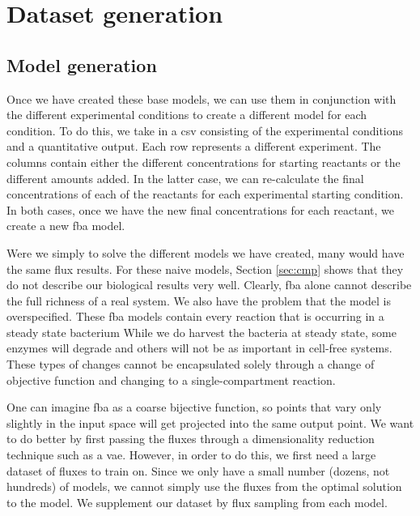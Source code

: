 
\section{Dataset generation}

\subsection{Model generation}
Once we have created these base models, we can use them in conjunction with the different experimental conditions to create a different model for each condition.
To do this, we take in a \gls{csv} consisting of the experimental conditions and a quantitative output.
Each row represents a different experiment.
The columns contain either the different concentrations for starting reactants or the different amounts added.
In the latter case, we can re-calculate the final concentrations of each of the reactants for each experimental starting condition.
In both cases, once we have the new final concentrations for each reactant, we create a new \gls{fba} model.

Were we simply to solve the different models we have created, many would have the same flux results.
For these naive models, Section \ref{sec:cmp} shows that they do not describe our biological results very well.
Clearly, \gls{fba} alone cannot describe the full richness of a real system.
We also have the problem that the model is overspecified.
These \gls{fba} models contain every reaction that is occurring in a steady state bacterium
While we do harvest the bacteria at steady state, some enzymes will degrade and others will not be as important in cell-free systems.
These types of changes cannot be encapsulated solely through a change of objective function and changing to a single-compartment reaction.

One can imagine \gls{fba} as a coarse bijective function, so points that vary only slightly in the input space will get projected into the same output point.
We want to do better by first passing the fluxes through a dimensionality reduction technique such as a \gls{vae}.
However, in order to do this, we first need a large dataset of fluxes to train on.
Since we only have a small number (dozens, not hundreds) of models, we cannot simply use the fluxes from the optimal solution to the model.
We supplement our dataset by flux sampling from each model.

